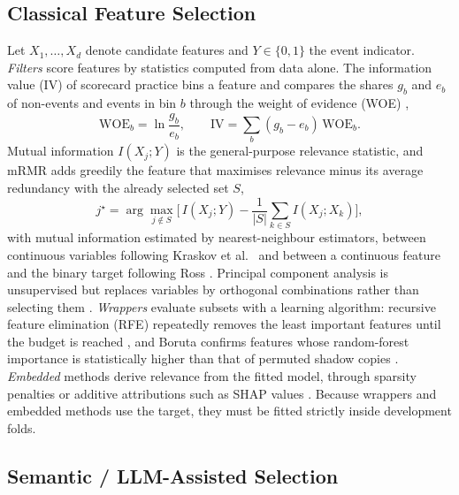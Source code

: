 \documentclass[final,5p,twocolumn]{elsarticle}
\begin{document}
\subsection{Classical Feature Selection}
\label{subsec:classical_fs_background}

Let $X_1,\dots,X_d$ denote candidate features and $Y\in\{0,1\}$ the event indicator. \emph{Filters} score features by statistics computed from data alone. The information value (IV) of scorecard practice bins a feature and compares the shares $g_b$ and $e_b$ of non-events and events in bin $b$ through the weight of evidence (WOE) \cite{siddiqi2006},
\begin{equation}
    \mathrm{WOE}_b=\ln\frac{g_b}{e_b},\qquad
    \mathrm{IV}=\sum_{b}(g_b-e_b)\,\mathrm{WOE}_b .
    \label{eq:iv}
\end{equation}
Mutual information $I(X_j;Y)$ is the general-purpose relevance statistic, and mRMR \cite{peng2005} adds greedily the feature that maximises relevance minus its average redundancy with the already selected set $S$,
\begin{equation}
    j^{\star}=\arg\max_{j\notin S}\Big[\,I(X_j;Y)-\frac{1}{|S|}\sum_{k\in S} I(X_j;X_k)\Big],
    \label{eq:mrmr}
\end{equation}
with mutual information estimated by nearest-neighbour estimators, between continuous variables following Kraskov et al.\ \cite{kraskov2004} and between a continuous feature and the binary target following Ross \cite{ross2014}. Principal component analysis is unsupervised but replaces variables by orthogonal combinations rather than selecting them \cite{jolliffe2016}. \emph{Wrappers} evaluate subsets with a learning algorithm: recursive feature elimination (RFE) repeatedly removes the least important features until the budget is reached \cite{guyon2002}, and Boruta confirms features whose random-forest importance is statistically higher than that of permuted shadow copies \cite{kursa2010,breiman2001}. \emph{Embedded} methods derive relevance from the fitted model, through sparsity penalties \cite{tibshirani1996} or additive attributions such as SHAP values \cite{lundberg2017}. Because wrappers and embedded methods use the target, they must be fitted strictly inside development folds.

\subsection{Semantic / LLM-Assisted Selection}
\label{subsec:llm_fs_background}
\end{document}
